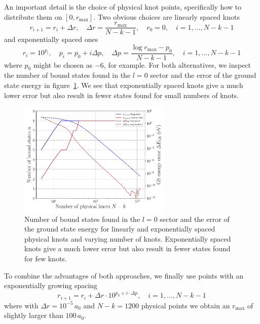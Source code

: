 \documentclass[a4paper,DIV=12,english]{scrartcl}
\begin{document}
An important detail is the choice of physical knot points, specifically how to distribute them on $[0, r_\text{max}]$. Two obvious choices are linearly spaced knots
\begin{equation}
    r_{i+1} = r_{i} + \Delta r, \quad \Delta r = \frac{r_\text{max}}{N-k-1}, \quad r_0 = 0, \quad i = 1,\dots,N-k-1
\end{equation}
and exponentially spaced ones
\begin{equation}
    r_{i} = 10^{p_i}, \quad p_i = p_0 + i\Delta p, \quad \Delta p = \frac{\log r_\text{max} - p_0}{N-k-1}, \quad i = 1,\dots,N-k-1
\end{equation}
where $p_0$ might be chosen as $-6$, for example. For both alternatives, we inspect the number of bound states found in the $l=0$ sector and the error of the ground state energy in figure~\ref{fig:nserrs}. We see that exponentially spaced knots give a much lower error but also result in fewer states found for small numbers of knots.
\FloatBarrier
\begin{figure}
    \centering
    \includegraphics[width=0.65\textwidth]{../plots/ns_errs.pdf}
    \caption{Number of bound states found in the $l=0$ sector and the error of the ground state energy for linearly and exponentially spaced physical knots and varying number of knots. Exponentially spaced knots give a much lower error but also result in fewer states found for few knots.}
    \label{fig:nserrs}
\end{figure}
To combine the advantages of both approaches, we finally use points with an exponentially growing spacing
\begin{equation}
    r_{i+1} = r_i + \Delta r \cdot 10^{p_0 + i\cdot \Delta p}, \quad i = 1,\dots,N-k-1
\end{equation}
where with $\Delta r = 10^{-5}\,a_0$ and $N-k=1200$ physical points we obtain an $r_\text{max}$ of slightly larger than $100\,a_0$.
\end{document}

